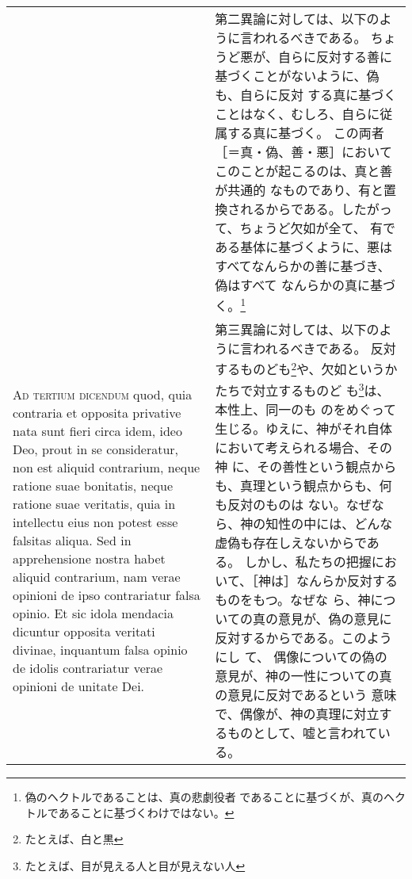 \documentclass[10pt]{jsarticle} %
\begin{document}
\begin{longtable}{p{21em}p{21em}}
&

第二異論に対しては、以下のように言われるべきである。
ちょうど悪が、自らに反対する善に基づくことがないように、偽も、自らに反対
 する真に基づくことはなく、むしろ、自らに従属する真に基づく。
この両者［＝真・偽、善・悪］においてこのことが起こるのは、真と善が共通的
 なものであり、有と置換されるからである。したがって、ちょうど欠如が全て、
 有である基体に基づくように、悪はすべてなんらかの善に基づき、偽はすべて
 なんらかの真に基づく。\footnote{偽のヘクトルであることは、真の悲劇役者
 であることに基づくが、真のヘクトルであることに基づくわけではない。}

\\


{\scshape Ad tertium dicendum} quod, quia contraria et opposita
 privative nata sunt fieri circa idem, ideo Deo, prout in se
 consideratur, non est aliquid contrarium, neque ratione suae bonitatis,
 neque ratione suae veritatis, quia in intellectu eius non potest esse
 falsitas aliqua. Sed in apprehensione nostra habet aliquid contrarium,
 nam verae opinioni de ipso contrariatur falsa opinio. Et sic idola
 mendacia dicuntur opposita veritati divinae, inquantum falsa opinio de
 idolis contrariatur verae opinioni de unitate Dei.

&

第三異論に対しては、以下のように言われるべきである。
反対するものども\footnote{たとえば、白と黒}や、欠如というかたちで対立するものど
 も\footnote{たとえば、目が見える人と目が見えない人}は、本性上、同一のも
 のをめぐって生じる。ゆえに、神がそれ自体において考えられる場合、その神
 に、その善性という観点からも、真理という観点からも、何も反対のものは
 ない。なぜなら、神の知性の中には、どんな虚偽も存在しえないからである。
しかし、私たちの把握において、［神は］なんらか反対するものをもつ。なぜな
 ら、神についての真の意見が、偽の意見に反対するからである。このようにし
 て、
 偶像についての偽の意見が、神の一性についての真の意見に反対であるという
 意味で、偶像が、神の真理に対立するものとして、嘘と言われている。



\end{longtable}
\end{document}
